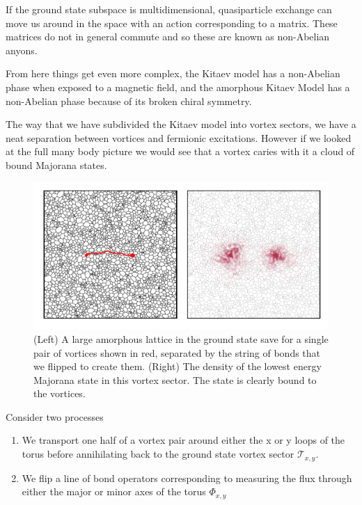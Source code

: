 If the ground state subspace is multidimensional, quasiparticle exchange can move us around in the space with an action corresponding to a matrix. These matrices do not in general commute and so these are known as non-Abelian anyons.

From here things get even more complex, the Kitaev model has a non-Abelian phase when exposed to a magnetic field, and the amorphous Kitaev Model has a non-Abelian phase because of its broken chiral symmetry.

The way that we have subdivided the Kitaev model into vortex sectors, we have a neat separation between vortices and fermionic excitations. However if we looked at the full many body picture we would see that a vortex caries with it a cloud of bound Majorana states.

\begin{figure}
\hypertarget{fig:majorana_bound_states}{%
\centering
\includegraphics[width=1\textwidth,height=\textheight]{figure_code/amk_chapter/majorana_bound_states/majorana_bound_states.pdf}
\caption{(Left) A large amorphous lattice in the ground state save for a single pair of vortices shown in red, separated by the string of bonds that we flipped to create them. (Right) The density of the lowest energy Majorana state in this vortex sector. The state is clearly bound to the vortices.}\label{fig:majorana_bound_states}
}
\end{figure}

Consider two processes

\begin{enumerate}
\def\labelenumi{\arabic{enumi})}
\item
  We transport one half of a vortex pair around either the x or y loops of the torus before annihilating back to the ground state vortex sector \(\mathcal{T}_{x,y}\).
\item
  We flip a line of bond operators corresponding to measuring the flux through either the major or minor axes of the torus \(\mathcal{\Phi}_{x,y}\)
\end{enumerate}


